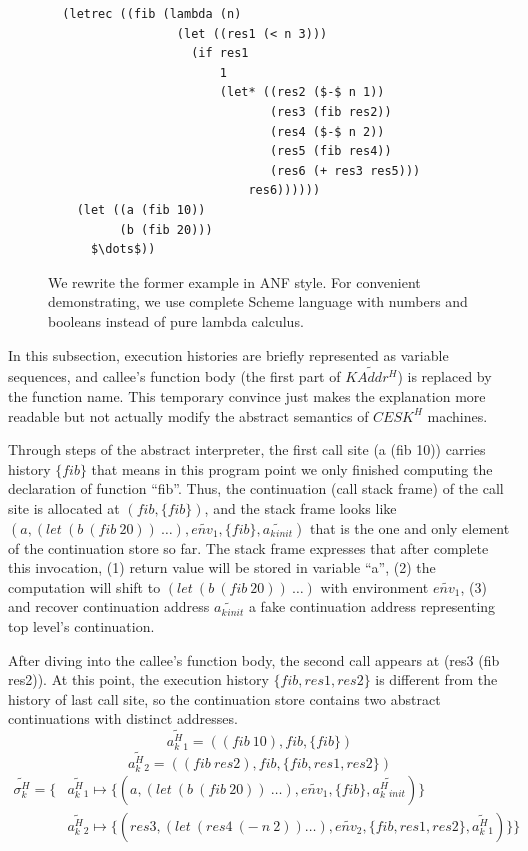 \documentclass{article}
\begin{document}
\begin{figure}[h]
\small
\lstset{language=Lisp}
\begin{lstlisting}
  (letrec ((fib (lambda (n)
                  (let ((res1 (< n 3)))
                    (if res1
                        1
                        (let* ((res2 ($-$ n 1))
                               (res3 (fib res2))
                               (res4 ($-$ n 2))
                               (res5 (fib res4))
                               (res6 (+ res3 res5)))
                            res6))))))
    (let ((a (fib 10))
          (b (fib 20)))
      $\dots$))
\end{lstlisting}
\caption{
We rewrite the former example in ANF style.
For convenient  demonstrating, we use complete Scheme language with numbers and booleans instead of pure lambda calculus.
}
\label{fig:anf-fib}
\end{figure}

In this subsection, execution histories are briefly represented as variable sequences, and callee's function body (the first part of $\widetilde{KAddr^H}$) is replaced by the function name. This temporary convince just makes the explanation more readable but not actually modify the abstract semantics of $CESK^H$ machines.

Through steps of the abstract interpreter, the first call site (a (fib 10)) carries history $\{fib\}$ that means in this program point we only finished computing the declaration of function ``fib''.
Thus, the continuation (call stack frame) of the call site is allocated at $(fib, \{fib\})$, and the stack frame looks like $(a, (let\ (b\ (fib\ 20))\ \dots), \widetilde{env_1}, \{fib\}, \widetilde{a_k{}_{init}})$ that is the one and only element of the continuation store so far.
The stack frame expresses that after complete this invocation,
(1) return value will be stored in variable ``a'',
(2) the computation will shift to $(let\ (b\ (fib\ 20))\ \dots)$ with environment $\widetilde{env_1}$,
(3) and recover continuation address $\widetilde{a_k{}_{init}}$ a fake continuation address representing top level's continuation.

After diving into the callee's function body, the second call appears at (res3 (fib res2)). At this point, the execution history $\{fib, res1, res2\}$ is different from the history of last call site, so the continuation store contains two abstract continuations with distinct addresses.
\[
\widetilde{a^H_k{}_1} = ((fib\ 10), fib, \{fib\})
\]
\[
\widetilde{a^H_k{}_2} = ((fib\ res2), fib, \{fib, res1, res2\})
\]
\[
\begin{aligned}
\label{eq:show-stack}
\widetilde{\sigma_k^H} = \{ {}& \widetilde{a^H_k{}_1} \mapsto \{(a, (let\ (b\ (fib\ 20))\ \dots), \widetilde{env_1}, \{fib\}, \widetilde{a^H_k{}_{init}})\}  {} \\
                              & \widetilde{a^H_k{}_2} \mapsto \{(res3, (let\ (res4\ (-\ n\ 2)) \dots), \widetilde{env_2}, \{fib, res1, res2\}, \tilde{a^H_k{}_1})\} \}
\end{aligned}
\]
\end{document}
